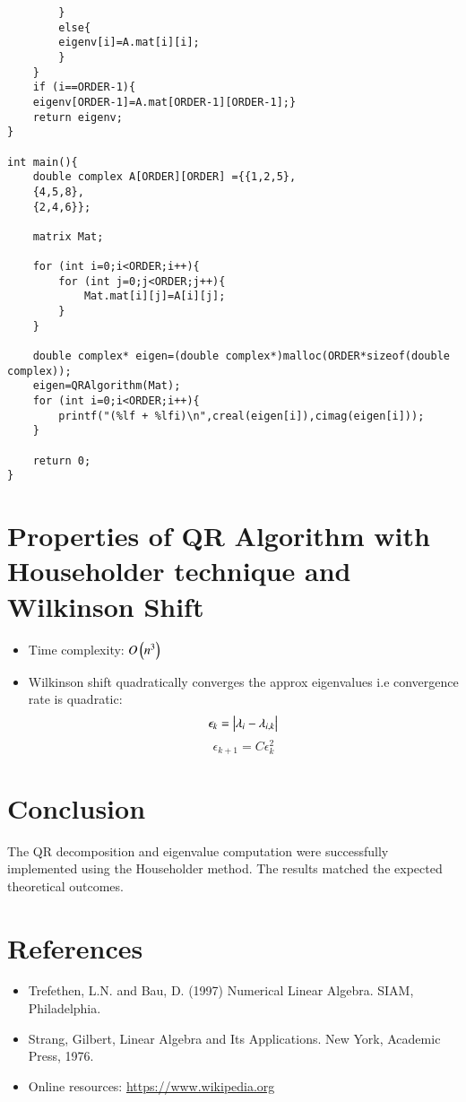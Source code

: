 \documentclass[journal,12pt,onecolumn]{IEEEtran}
\theoremstyle{remark}
\begin{document}
\begin{verbatim}
        }
        else{
        eigenv[i]=A.mat[i][i];
        }
    }
    if (i==ORDER-1){
    eigenv[ORDER-1]=A.mat[ORDER-1][ORDER-1];}
    return eigenv;
}

int main(){
	double complex A[ORDER][ORDER] ={{1,2,5},
    {4,5,8},
    {2,4,6}};

    matrix Mat;

    for (int i=0;i<ORDER;i++){
        for (int j=0;j<ORDER;j++){
            Mat.mat[i][j]=A[i][j];
        }
    }                             
	
	double complex* eigen=(double complex*)malloc(ORDER*sizeof(double complex));
    eigen=QRAlgorithm(Mat);
	for (int i=0;i<ORDER;i++){
		printf("(%lf + %lfi)\n",creal(eigen[i]),cimag(eigen[i]));
	}
    
	return 0;
}
\end{verbatim}

\section{Properties of QR Algorithm with Householder technique and Wilkinson Shift}
\begin{itemize}
    \item Time complexity: $O\left(n^3\right)$
    \item Wilkinson shift quadratically converges the approx eigenvalues i.e convergence rate is quadratic:
    $$\epsilon_k=\left\vert\lambda_i-\lambda_{i,k}\right\vert$$
    $$\epsilon_{k+1}=C\epsilon_k^2$$
\end{itemize}

\section{Conclusion}
The QR decomposition and eigenvalue computation were successfully implemented using the Householder method. The results matched the expected theoretical outcomes.

\section{References}
\begin{itemize}
    \item Trefethen, L.N. and Bau, D. (1997) Numerical Linear Algebra. SIAM, Philadelphia. 
    \item Strang, Gilbert, Linear Algebra and Its Applications. New York, Academic Press, 1976. 
    \item Online resources: \url{https://www.wikipedia.org}
\end{itemize}

\end{document}
